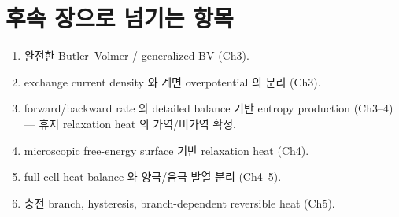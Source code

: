 \section{후속 장으로 넘기는 항목}\label{sec:ch2_transmit}
\begin{enumerate}[label=\arabic*),leftmargin=2.0em]
\item 완전한 Butler--Volmer / generalized BV (Ch3).
\item exchange current density 와 계면 overpotential 의 분리 (Ch3).
\item forward/backward rate 와 detailed balance 기반 entropy production (Ch3--4) — 휴지 relaxation heat 의
  가역/비가역 확정.
\item microscopic free-energy surface 기반 relaxation heat (Ch4).
\item full-cell heat balance 와 양극/음극 발열 분리 (Ch4--5).
\item 충전 branch, hysteresis, branch-dependent reversible heat (Ch5).
\end{enumerate}

